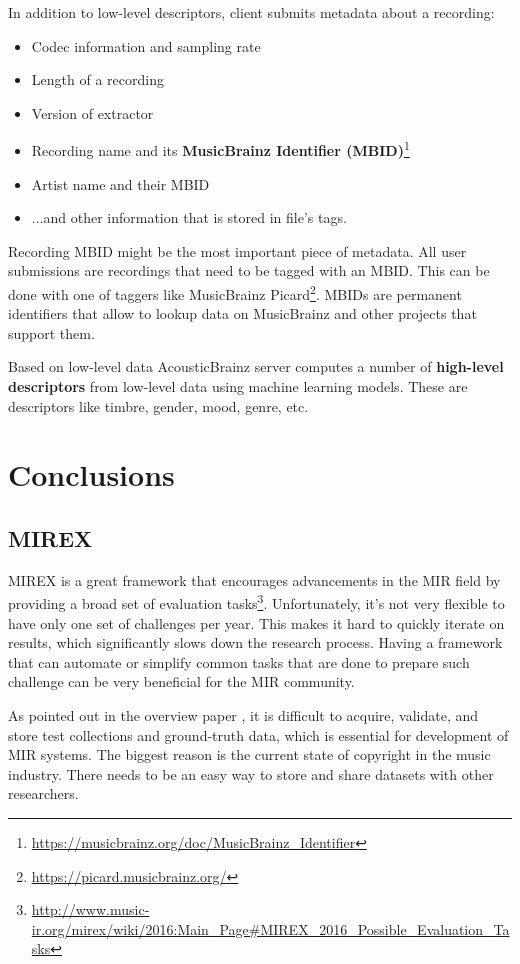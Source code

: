 In addition to low-level descriptors, client submits metadata about a recording:
\begin{itemize}
    \item Codec information and sampling rate
    \item Length of a recording
    \item Version of extractor
    \item Recording name and its \textbf{MusicBrainz Identifier (MBID)}\footnote{\url{https://musicbrainz.org/doc/MusicBrainz_Identifier}}
    \item Artist name and their MBID
    \item ...and other information that is stored in file's tags.
\end{itemize}
Recording MBID might be the most important piece of metadata. All user submissions are recordings that need to be tagged with an MBID. This can be done with one of taggers like MusicBrainz Picard\footnote{\url{https://picard.musicbrainz.org/}}. MBIDs are permanent identifiers that allow to lookup data on MusicBrainz and other projects that support them.

Based on low-level data AcousticBrainz server computes a number of \textbf{high-level descriptors} from low-level data using machine learning models. These are descriptors like timbre, gender, mood, genre, etc.

\section{Conclusions}

\subsection{MIREX}

MIREX is a great framework that encourages advancements in the MIR field by providing a broad set of evaluation tasks\footnote{\url{http://www.music-ir.org/mirex/wiki/2016:Main_Page#MIREX_2016_Possible_Evaluation_Tasks}}. Unfortunately, it's not very flexible to have only one set of challenges per year. This makes it hard to quickly iterate on results, which significantly slows down the research process. Having a framework that can automate or simplify common tasks that are done to prepare such challenge can be very beneficial for the MIR community.

As pointed out in the overview paper \cite{downie2008mirex}, it is difficult to acquire, validate, and store test collections and ground-truth data, which is essential for development of MIR systems. The biggest reason is the current state of copyright in the music industry. There needs to be an easy way to store and share datasets with other researchers.

